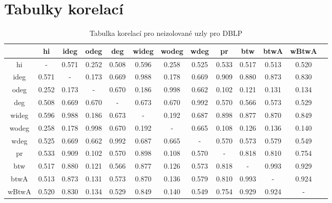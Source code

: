 \documentclass{bakalarka}
\begin{document}
\chapter{Tabulky korelací}
\begin{table}[!ht]
\centering
\begin{sideways}
\begin{tabular}{c|cccccccccccc}
\toprule
&hi  &ideg &odeg &deg  &wideg&wodeg&wdeg &pr   &btw  &btwA &wBtwA\\
\midrule
hi   &  -  &0.571&0.252&0.508&0.596&0.258&0.525&0.533&0.517&0.513&0.520\\
ideg &0.571&  -  &0.173&0.669&0.988&0.178&0.669&0.909&0.880&0.873&0.830\\
odeg &0.252&0.173&  -  &0.670&0.186&0.998&0.662&0.102&0.121&0.131&0.134\\
deg  &0.508&0.669&0.670&  -  &0.673&0.670&0.992&0.570&0.566&0.573&0.529\\
wideg&0.596&0.988&0.186&0.673&  -  &0.192&0.687&0.898&0.877&0.870&0.849\\
wodeg&0.258&0.178&0.998&0.670&0.192&  -  &0.665&0.108&0.126&0.136&0.140\\
wdeg &0.525&0.669&0.662&0.992&0.687&0.665&  -  &0.570&0.573&0.579&0.549\\
pr   &0.533&0.909&0.102&0.570&0.898&0.108&0.570&  -  &0.818&0.810&0.754\\
btw  &0.517&0.880&0.121&0.566&0.877&0.126&0.573&0.818&  -  &0.993&0.929\\
btwA &0.513&0.873&0.131&0.573&0.870&0.136&0.579&0.810&0.993&  -  &0.924\\
wBtwA&0.520&0.830&0.134&0.529&0.849&0.140&0.549&0.754&0.929&0.924&  -  \\
\bottomrule
\end{tabular}
\end{sideways}
\caption{Tabulka korelací pro neizolované uzly pro DBLP}
\label{tab:corr1}
\end{table}
\end{document}
